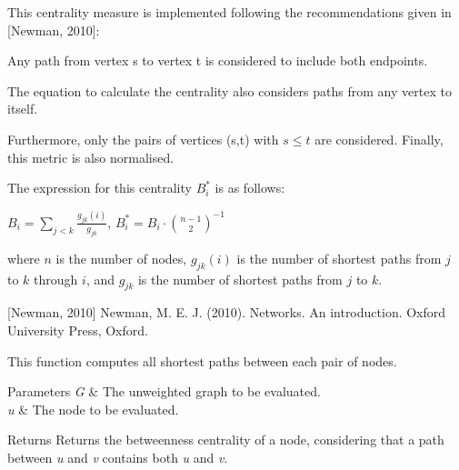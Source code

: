This centrality measure is implemented following the recommendations given in \mbox{[}Newman, 2010\mbox{]}\+:
\begin{DoxyItemize}
\item Any path from vertex \textquotesingle{}s\textquotesingle{} to vertex \textquotesingle{}t\textquotesingle{} is considered to include both endpoints.
\item The equation to calculate the centrality also considers paths from any vertex to itself.
\end{DoxyItemize}

Furthermore, only the pairs of vertices (s,t) with $s \le t$ are considered. Finally, this metric is also normalised.

The expression for this centrality $B_i^*$ is as follows\+:

$ B_i = \sum_{j < k} \frac{g_{jk}(i)}{g_{jk}} $, $B_i^* = B_i \cdot {n - 1 \choose 2}^{-1}$

where $n$ is the number of nodes, $g_{jk}(i)$ is the number of shortest paths from $j$ to $k$ through $i$, and $g_{jk}$ is the number of shortest paths from $j$ to $k$.

\mbox{[}Newman, 2010\mbox{]} Newman, M. E. J. (2010). Networks. An introduction. Oxford University Press, Oxford.

This function computes all shortest paths between each pair of nodes. 
\begin{DoxyParams}{Parameters}
{\em G} & The unweighted graph to be evaluated. \\
\hline
{\em u} & The node to be evaluated. \\
\hline
\end{DoxyParams}
\begin{DoxyReturn}{Returns}
Returns the betweenness centrality of a node, considering that a path between {\itshape u} and {\itshape v} contains both {\itshape u} and {\itshape v}. 
\end{DoxyReturn}
\mbox{\label{namespacelgraph_1_1networks_1_1metrics_1_1centralities_a22d289500772bb1c1c40f705f8cfcdf0}} 
